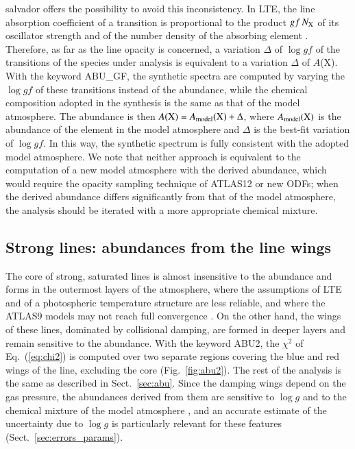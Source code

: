 \documentclass{aa}
\newcommand{\salvador}{salvador}   %
\begin{document}
\salvador{} offers the possibility to avoid this inconsistency. In LTE,
the line absorption coefficient of a transition is proportional to the
product $gf\,N_{\rm X}$ of its oscillator strength and of the number
density of the absorbing element \citep[e.g.,][]{Gray2005}. Therefore,
as far as the line opacity is concerned, a variation $\Delta$ of
$\log gf$ of the transitions of the species under analysis is
equivalent to a variation $\Delta$ of $A$(X). With the keyword
ABU\_GF, the synthetic spectra are computed by varying the $\log gf$ of
these transitions instead of the abundance, while the chemical
composition adopted in the synthesis is the same as that of the model
atmosphere. The abundance is then $A({\rm X})=A_{\rm model}({\rm
X})+\Delta$, where $A_{\rm model}({\rm X})$ is the abundance of the
element in the model atmosphere and $\Delta$ is the best-fit variation
of $\log gf$. In this way, the synthetic spectrum is fully consistent
with the adopted model atmosphere. We note that neither approach is
equivalent to the computation of a new model atmosphere with the
derived abundance, which would require the opacity sampling technique
of ATLAS12 \citep{Kurucz2005} or new ODFs; when the derived abundance
differs significantly from that of the model atmosphere, the analysis
should be iterated with a more appropriate chemical mixture.

\subsection{Strong lines: abundances from the line wings}
\label{sec:abu2}

The core of strong, saturated lines is almost insensitive to the
abundance and forms in the outermost layers of the atmosphere, where
the assumptions of LTE and of a photospheric temperature structure are
less reliable, and where the ATLAS9 models may not reach full
convergence \citep{Mucciarelli2026}. On the other hand, the wings of
these lines, dominated by collisional damping, are formed in deeper
layers and remain sensitive to the abundance. With the keyword ABU2,
the $\chi^2$ of Eq.~(\ref{eq:chi2}) is computed over two separate regions
covering the blue and red wings of the line, excluding the core
(Fig.~\ref{fig:abu2}). The rest of the analysis is the same as described
in Sect.~\ref{sec:abu}. Since the damping wings depend on the gas
pressure, the abundances derived from them are sensitive to $\log g$
and to the chemical mixture of the model atmosphere
\citep{Mucciarelli2026}, and an accurate estimate of the uncertainty
due to $\log g$ is particularly relevant for these features
(Sect.~\ref{sec:errors_params}).
\end{document}
